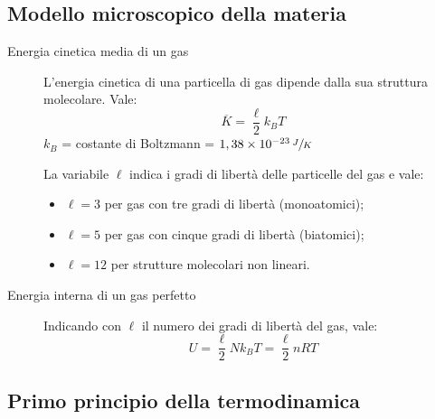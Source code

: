 \documentclass[a4paper,11pt,italian]{article}
\begin{document}
\subsection{Modello microscopico della materia}
\begin{description}
  \item[Energia cinetica media di un gas] 
  L'energia cinetica di una particella di gas dipende dalla sua struttura molecolare. Vale:
  \[ \overline{K} = \dfrac{\ell}{2}k_B T \]
  $ k_B $ = costante di Boltzmann = $ 1,38 \times 10^{-23} \, \sfrac{J}{K} $

  La variabile $ \ell $ indica i gradi di libertà delle particelle del gas e vale:
  \begin{itemize}
    \item $ \ell = 3 $ per gas con tre gradi di libertà (monoatomici);
    \item $ \ell = 5 $ per gas con cinque gradi di libertà (biatomici);
    \item $ \ell = 12 $ per strutture molecolari non lineari.
  \end{itemize}

  
  
  \item[Energia interna di un gas perfetto] 
  Indicando con $ \ell $ il numero dei gradi di libertà del gas, vale:
  \[ U = \frac{\ell}{2} N k_B T = \frac{\ell}{2} n R T  \]
\end{description}

\subsection{Primo principio della termodinamica}
\end{document}
